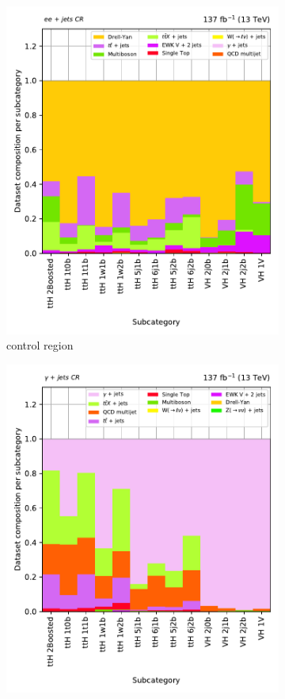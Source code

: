 \begin{figure}[htbp]
\begin{subfigure}[b]{0.3\textwidth}
        \includegraphics[width=\textwidth]{figures/region_plots/full_Run2/region_4/background_composition.pdf}
        \caption{\doubleEleCr control region}
    \end{subfigure}
    \hfill
    \begin{subfigure}[b]{0.3\textwidth}
        \includegraphics[width=\textwidth]{figures/region_plots/full_Run2/region_5/background_composition.pdf}

\end{subfigure}
\end{figure}
